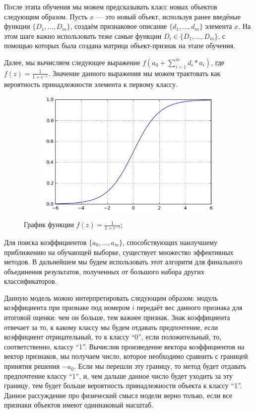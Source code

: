 После этапа обучения мы можем предсказывать класс новых объектов следующим образом. Пусть $x$ — это новый объект, используя ранее введёные функции $\{D_1, \dots, D_m \}$, создаём признаковое описание $\{d_1,…,d_m\}$ элемента $x$. На этом шаге важно использовать теже самые функции $D_i \in \{D_1, \dots, D_m \}$, с помощью которых была создана матрица объект-признак на этапе обучения.

Далее, мы вычисляем следующее выражение $ f \left( a_0 + \sum_{i=1}^{m} d_i * a_i \right)$, где $f \left( z \right) = \frac{1}{1 + e^{-z}}$. Значение данного выражения мы можем трактовать как вероятность принадлежности элемента к первому классу.

\begin{figure}[ht]
	\centering
    \begin{subfigure}[b]{1\textwidth}
    \centering
        \includegraphics[scale=0.5]{pasted-image-15.png}
    \end{subfigure}
 
    \caption{График функции $f \left( z \right) = \frac{1}{1 + e^{-z}}$;}
    \label{fig_parsetree}
\end{figure}

Для поиска коэффициентов $\{a_0,…,a_m\}$, способствующих наилучшему приближению на обучающей выборке, существует множество эффективных методов. В дальнейшем мы будем использовать этот алгоритм для финального объединения результатов, полученных от большого набора других классификаторов. 

Данную модель можно интерпретировать следующим образом: модуль коэффициента при признаке под номером $i$ передаёт вес данного признака для итоговой оценки: чем он больше, тем важнее признак. Знак коэффициента отвечает за то, к какому классу мы будем отдавать предпочтение, если коэффициент отрицательный, то к классу “0”, если положительный, то, соответственно, классу “1”. Вычислив произведение вектора коэффициентов на вектор признаков, мы получаем число, которое необходимо сравнить с границей принятия решения $-a_0$. Если мы перешли эту границу, то метод будет отдавать предпочтение классу “1”, и, чем дальше данное число будет уходить за эту границу, тем будет больше вероятность принадлежности объекта к классу “1”. Данное рассуждение про физический смысл модели верно только, если все признаки объектов имеют одиннаковый масштаб.

